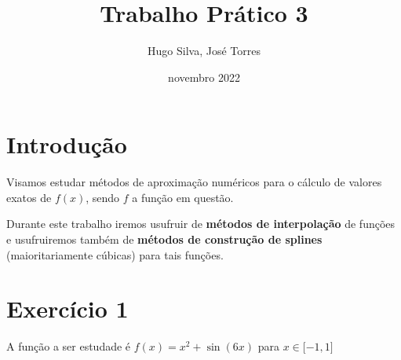 \documentclass[12pt, letterpaper]{article}
\title{Trabalho Prático 3}
\author{Hugo Silva, José Torres}
\date{novembro 2022}
\begin{document}
\maketitle

\section*{Introdução}

Visamos estudar métodos de aproximação numéricos para o cálculo de valores exatos de $f(x)$, sendo $f$ a função em questão.

Durante este trabalho iremos usufruir de \textbf{métodos de interpolação} de funções e usufruiremos também de \textbf{métodos de construção de splines} (maioritariamente cúbicas) para tais funções. 

\section*{Exercício 1}

A função a ser estudade é $f(x) = x^2 + \sin(6x)$ para $x \in \mathopen[-1,1\mathclose]$

\begin{quote}
\centering
\end{quote}
\end{document}
